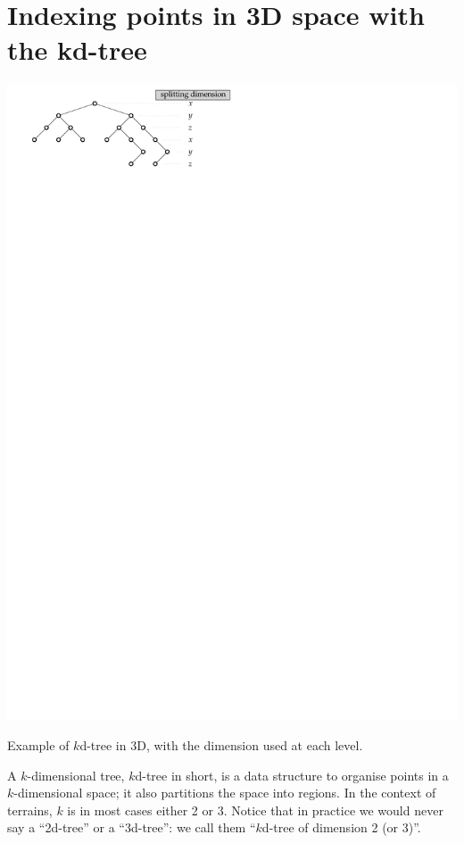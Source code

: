%
\section[kd-tree]{Indexing points in 3D space with the kd-tree}%
\label{sec:kdtree}

\begin{marginfigure}
  \centering
  \includegraphics[width=\linewidth]{figs/kdtree}
  \caption{Example of $k$d-tree in 3D, with the dimension used at each level.}%
\end{marginfigure} 

A $k$-dimensional tree, $k$d-tree in short, is a data structure to organise points in a $k$-dimensional space; it also partitions the space into regions.
In the context of terrains, $k$ is in most cases either 2 or 3.
Notice that in practice we would never say a ``2d-tree'' or a ``3d-tree'': we call them ``$k$d-tree of dimension 2 (or 3)''.

